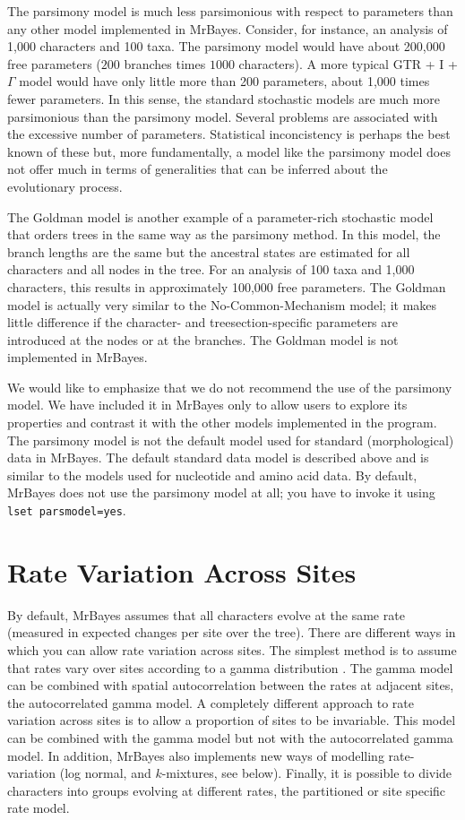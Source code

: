 \documentclass[12pt]{book}
\newcommand{\ttt}[1]{\texttt{#1}}
\begin{document}
The parsimony model is much less parsimonious with respect to parameters than any other model
implemented in MrBayes. Consider, for instance, an analysis of 1,000 characters and 100 taxa. The
parsimony model would have about 200,000 free parameters ($200$ branches times $1000$ characters).
A more typical GTR + I + $\Gamma$ model would have only little more than 200 parameters, about
1,000 times fewer parameters. In this sense, the standard stochastic models are much more
parsimonious than the parsimony model. Several problems are associated with the excessive number of
parameters.  Statistical inconcistency is perhaps the best known of these but, more fundamentally,
a model like the parsimony model does not offer much in terms of generalities that can be inferred
about the evolutionary process.

The Goldman \citep{goldman93} model is another example of a parameter-rich stochastic model that
orders trees in the same way as the parsimony method. In this model, the branch lengths are the
same but the ancestral states are estimated for all characters and all nodes in the tree. For an
analysis of 100 taxa and 1,000 characters, this results in approximately 100,000 free parameters.
The Goldman model is actually very similar to the No-Common-Mechanism model; it makes little
difference if the character- and treesection-specific parameters are introduced at the nodes or at
the branches. The Goldman model is not implemented in MrBayes.

We would like to emphasize that we do not recommend the use of the parsimony model. We have
included it in MrBayes only to allow users to explore its properties and contrast it with the other
models implemented in the program. The parsimony model is not the default model used for standard
(morphological) data in MrBayes. The default standard data model is described above and is similar
to the models used for nucleotide and amino acid data. By default, MrBayes does not use the
parsimony model at all; you have to invoke it using \ttt{lset parsmodel=yes}.

\section{Rate Variation Across Sites}

By default, MrBayes assumes that all characters evolve at the same rate (measured in expected
changes per site over the tree). There are different ways in which you can allow rate variation
across sites. The simplest method is to assume that rates vary over sites according to a gamma
distribution \citep{yang93}. The gamma model can be combined with spatial autocorrelation between
the rates at adjacent sites, the autocorrelated gamma model. A completely different approach to
rate variation across sites is to allow a proportion of sites to be invariable. This model can be
combined with the gamma model but not with the autocorrelated gamma model. In addition, MrBayes
also implements new ways of modelling rate-variation (log normal, and $k$-mixtures, see below).
Finally, it is possible to divide characters into groups evolving at different rates, the
partitioned or site specific rate model.
\end{document}
